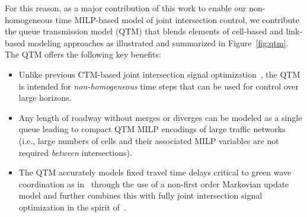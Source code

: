 \begin{figure*}[t!]
\centering
\caption{(a) Example of a real traffic network modeled using the
  QTM. (b) A preview of different QTM model parameters as a function
  of \emph{non-homogeneous} discretized time intervals indexed by $n$.
  For each $n$, we show the following parameters: the elapsed time
  $t$, the non-homogeneous time step length $\Delta t$, the cumulative
  duration $d$ of two different light phases for $l_6$, the phase $p$
  of light $l_6$, and the traffic volume of different queues $q$
  linearly interpolated between time points.  There is technically a
  binary $p$ for each phase, but we abuse notation and simply
  show the current active phase: $\mathit{NS}$ for \emph{north-south green} and 
  $\mathit{EW}$ for \emph{east-west green} assuming the top of the map is north.
  Here we see that traffic progresses from $q_1$ to $q_7$ to $q_9$
  according to light phases and traffic propagation delay with non-homogeneous time steps
  only at required changepoints.
  We refer to the QTM model section for
  precise notation and technical definitions.}
\label{fig:qtm}
%
\end{figure*}

For this reason, as a major contribution of this work to enable our
non-homogeneous time MILP-based model of joint intersection control, we
contribute the queue transmission model (QTM) that blends elements of
cell-based and link-based modeling approaches as illustrated
and summarized in Figure~\ref{fig:qtm}.  The QTM offers the following key benefits:
\begin{itemize}
%
\item  Unlike previous CTM-based joint intersection signal 
  optimization~, the QTM is
  intended for \emph{non-homogeneous} time steps that can
  be used for control over large horizons.
%
\item Any length of roadway without merges or diverges can be modeled
  as a single queue leading to compact QTM MILP encodings of large traffic
  networks 
  (i.e., large numbers of cells and their associated MILP variables are
  not required \emph{between} intersections).
%
\item The QTM accurately models fixed travel time delays critical to green wave
  coordination as
  in~
  through the use of a non-first order Markovian update model and further combines this
  with fully joint intersection signal optimization in the spirit 
  of~.
\end{itemize}

